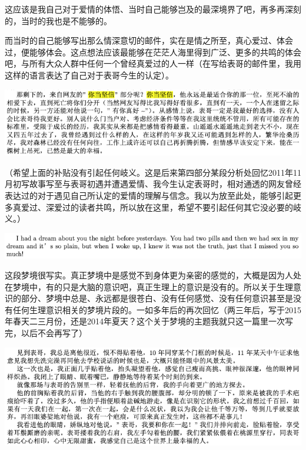 \documentclass[9pt, b5paper]{article}
\begin{document}
这应该是我自己对于爱情的体悟、当时自己能够岂及的最深境界了吧，再多再深刻的，当时的我也是不能够的。

而当时的自己能够写出那么情深意切的邮件，实在是情之所至，真心爱过、体会过，便能够体会。这点想法应该最能够在茫茫人海里得到广泛、更多的共鸣的体会吧，与所有大众人群中任何一个曾经真爱过的人一样（在写给表哥的邮件里，我用这样的语言表达了自己对于表哥今生的认定）。

\begin{center}
\includegraphics[width=.9\linewidth]{./pic/p4p15.png}
\end{center}

（希望上面的补贴没有引起任何岐义。这是后来第四部分某段分析处回忆2011年11月初写故事写至与表哥初遇并遭遇爱情、我今生认定表哥时，相对通透的网友曾经表达过的对于遇见自己所认定的爱情的理解与信念。我以为放至此处，能够引起更多真爱过、深爱过的读者共鸣，所以放在这里，希望不要引起任何其它没必要的岐义。）

\begin{center}
\includegraphics[width=.9\linewidth]{./pic/p1p116-5.png}
\end{center}

这段梦境很写实。真正梦境中是感觉不到身体更为亲密的感觉的，大概是因为人处在梦境中，有的只是大脑的意识吧，真正生理上的意识是没有的。所以关于生理意识的部分、梦境中总是、永远都是很苍白、没有任何感觉、没有任何意识甚至是没有任何生理意识相关的梦境片段的。一如多年后的再次回忆（两三年后，写于2015年春天二三月份，还是2014年夏天？这个关于梦境的主题我就只这一篇里一次写完，以后不会再写了）

\begin{center}
\includegraphics[width=.9\linewidth]{./pic/p4p17.png}
\end{center}
\end{document}
